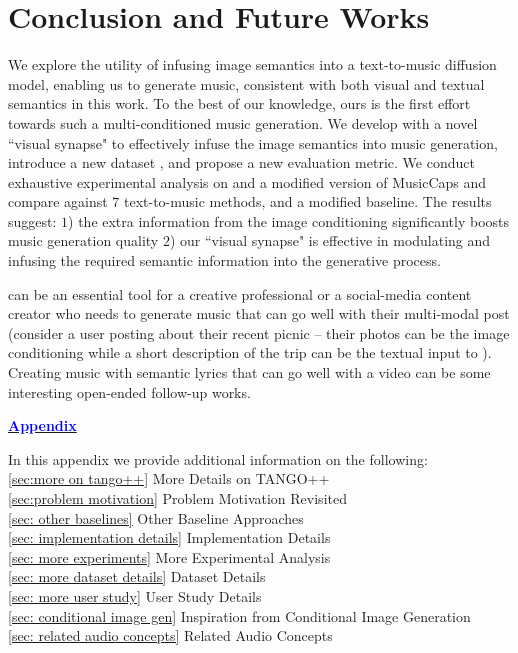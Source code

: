 \vspace{10pt}
\section{Conclusion and Future Works}
\label{Conclusions}
We explore the utility of infusing image semantics into a text-to-music diffusion model, enabling us to generate music, consistent with both visual and textual semantics in this work. To the best of our knowledge, ours is the first effort towards such a multi-conditioned music generation. We develop \modelname with a novel ``visual synapse" to effectively infuse the image semantics into music generation, introduce a new dataset \ourdataset, and propose a new evaluation metric.
We conduct exhaustive experimental analysis on  \ourdataset and a modified version of MusicCaps \cite{musiclm} and compare \modelname against $7$ text-to-music methods, and a modified baseline. The results suggest: $1$) the extra information from the image conditioning significantly boosts music generation quality $2$) our ``visual synapse" is effective in modulating and infusing the required semantic information into the generative process.

\modelname can be an essential tool for a creative professional or a social-media content creator who needs to generate music that can go well with their multi-modal post (consider a user posting about their recent picnic -- their photos can be the image conditioning while a short description of the trip can be the textual input to \modelname). Creating music with semantic lyrics that can go well with a video can be some interesting open-ended follow-up works.

{
    \small

}

\newpage

\newpage
\appendix

\begin{center}
\begin{LARGE}
\textbf{\underline{\textcolor{blue}{Appendix}}}
\end{LARGE}
\end{center}

\noindent In this appendix we provide additional information on the following: \\
\ref{sec:more on tango++} More Details on TANGO++ \\
\ref{sec:problem motivation} Problem Motivation Revisited \\
\ref{sec: other baselines} Other Baseline Approaches\\
\ref{sec: implementation details} Implementation Details \\
\ref{sec: more experiments} More Experimental Analysis \\
\ref{sec: more dataset details} Dataset Details \\
\ref{sec: more user study} User Study Details \\
\ref{sec: conditional image gen} Inspiration from Conditional Image Generation \\
\ref{sec: related audio concepts} Related Audio Concepts \\

